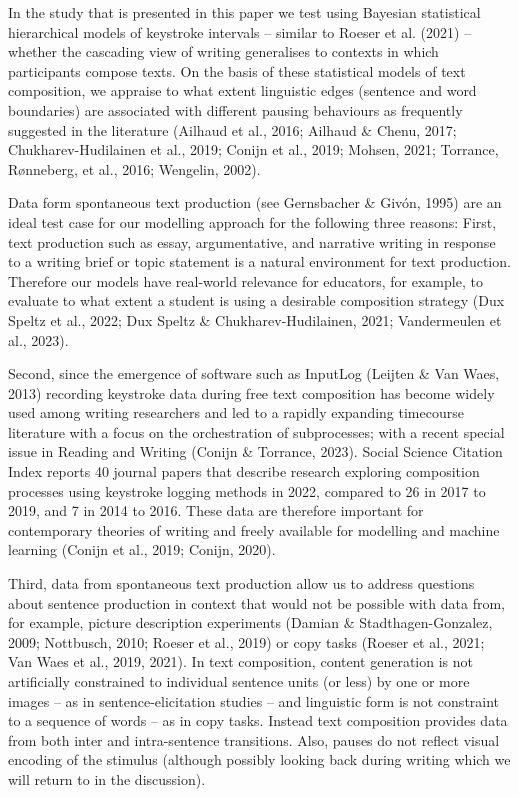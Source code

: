 \documentclass[
  english,
  man,floatsintext]{apa7}
\begin{document}
In the study that is presented in this paper we test using Bayesian statistical hierarchical models of keystroke intervals -- similar to Roeser et al. (2021) -- whether the cascading view of writing generalises to contexts in which participants compose texts. On the basis of these statistical models of text composition, we appraise to what extent linguistic edges (sentence and word boundaries) are associated with different pausing behaviours as frequently suggested in the literature (Ailhaud et al., 2016; Ailhaud \& Chenu, 2017; Chukharev-Hudilainen et al., 2019; Conijn et al., 2019; Mohsen, 2021; Torrance, Rønneberg, et al., 2016; Wengelin, 2002).

Data form spontaneous text production (see Gernsbacher \& Givón, 1995) are an ideal test case for our modelling approach for the following three reasons: First, text production such as essay, argumentative, and narrative writing in response to a writing brief or topic statement is a natural environment for text production. Therefore our models have real-world relevance for educators, for example, to evaluate to what extent a student is using a desirable composition strategy (Dux Speltz et al., 2022; Dux Speltz \& Chukharev-Hudilainen, 2021; Vandermeulen et al., 2023).

Second, since the emergence of software such as InputLog (Leijten \& Van Waes, 2013) recording keystroke data during free text composition has become widely used among writing researchers and led to a rapidly expanding timecourse literature with a focus on the orchestration of subprocesses; with a recent special issue in Reading and Writing (Conijn \& Torrance, 2023). Social Science Citation Index reports 40 journal papers that describe research exploring composition processes using keystroke logging methods in 2022, compared to 26 in 2017 to 2019, and 7 in 2014 to 2016. These data are therefore important for contemporary theories of writing and freely available for modelling and machine learning (Conijn et al., 2019; Conijn, 2020).

Third, data from spontaneous text production allow us to address questions about sentence production in context that would not be possible with data from, for example, picture description experiments (Damian \& Stadthagen-Gonzalez, 2009; Nottbusch, 2010; Roeser et al., 2019) or copy tasks (Roeser et al., 2021; Van Waes et al., 2019, 2021). In text composition, content generation is not artificially constrained to individual sentence units (or less) by one or more images -- as in sentence-elicitation studies -- and linguistic form is not constraint to a sequence of words -- as in copy tasks. Instead text composition provides data from both inter and intra-sentence transitions. Also, pauses do not reflect visual encoding of the stimulus (although possibly looking back during writing which we will return to in the discussion).
\end{document}
